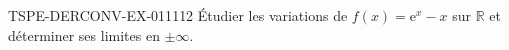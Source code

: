 \begin{exercice}{TSPE-DERCONV-EX-011}{1}{12}
Étudier les variations de $f(x) = \mathrm{e}^x - x$ sur $\mathbb{R}$ et déterminer ses limites en $\pm\infty$.

\end{exercice}
